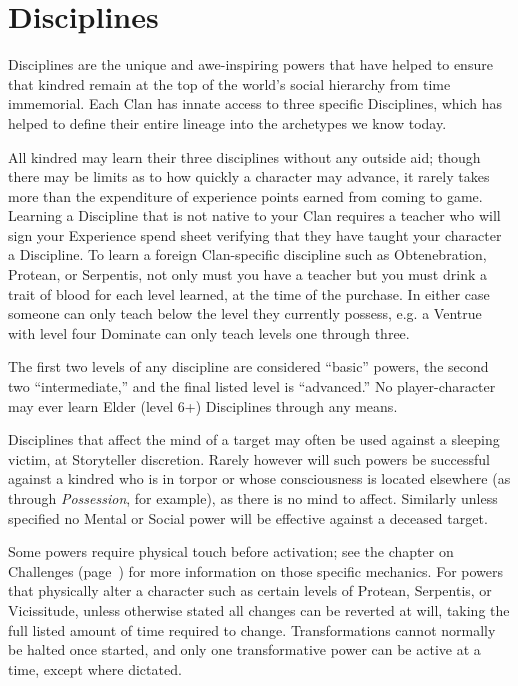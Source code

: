 \section{Disciplines}
\label{sec:disciplines}
Disciplines are the unique and awe-inspiring powers that have helped to ensure that 
kindred remain at the top of the world's social hierarchy from time immemorial.  
Each Clan has innate access to three specific Disciplines, which has helped to 
define their entire lineage into the archetypes we know today.

All kindred may learn their three disciplines without any outside aid; though there 
may be limits as to how quickly a character may advance, it rarely takes more than 
the expenditure of experience points earned from coming to game.  Learning a 
Discipline that is not native to your Clan requires a teacher who will sign your 
Experience spend sheet verifying that they have taught your character a Discipline.  
To learn a foreign Clan-specific discipline such as Obtenebration, Protean, or Serpentis, 
not only must you have a teacher but you must drink a trait of blood for each level 
learned, at the time of the purchase.  In either case someone can only teach below the 
level they currently possess, e.g. a Ventrue with level four Dominate can only teach 
levels one through three.

The first two levels of any discipline are considered ``basic'' powers, the second two 
``intermediate,'' and the final listed level is ``advanced.''  No player-character may 
ever learn Elder (level 6+) Disciplines through any means.

Disciplines that affect the mind of a target may often be used against a sleeping victim, 
at Storyteller discretion.  Rarely however will such powers be successful against a kindred 
who is in torpor or whose consciousness is located elsewhere (as through \emph{Possession}, 
for example), as there is no mind to affect.  Similarly unless specified no Mental or Social 
power will be effective against a deceased target.

Some powers require physical touch before activation; see the chapter on Challenges 
(page~\pageref{sec:challenges}) for more information on those specific mechanics.  For powers 
that physically alter a character such as certain levels of Protean, Serpentis, or Vicissitude, 
unless otherwise stated all changes can be reverted at will, taking the full listed amount of 
time required to change.  Transformations cannot normally be halted once started, and only one 
transformative power can be active at a time, except where dictated.

